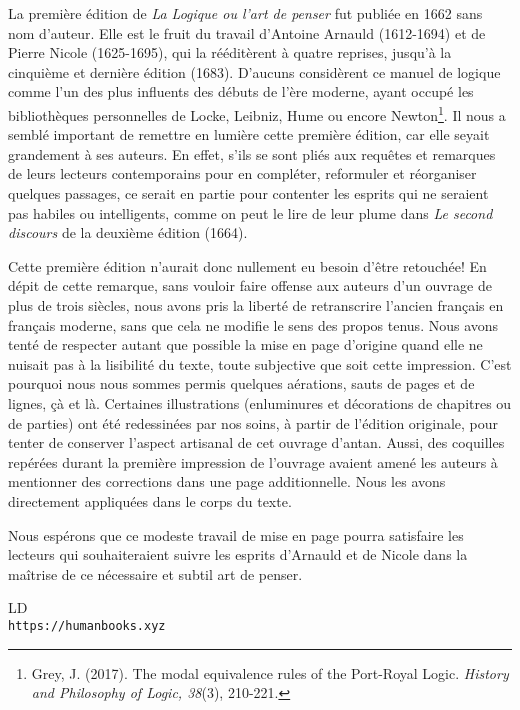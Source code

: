 La première édition de \emph {La Logique ou l'art de penser} fut publiée en 1662 sans nom d'auteur. Elle est le fruit du travail d'Antoine Arnauld (1612-1694) et de Pierre Nicole (1625-1695), qui la rééditèrent à quatre reprises, jusqu'à la cinquième et dernière édition (1683).
D'aucuns considèrent ce manuel de logique comme l'un des plus influents des débuts de l'ère moderne, ayant occupé les bibliothèques personnelles de Locke, Leibniz, Hume ou encore Newton\footnote{Grey, J. (2017). The modal equivalence rules of the Port-Royal Logic. \emph{History and Philosophy of Logic, 38}(3), 210-221.}.
Il nous a semblé important de remettre en lumière cette première édition, car elle seyait grandement à ses auteurs. En effet, s'ils se sont pliés aux requêtes et remarques de leurs lecteurs contemporains pour en compléter, reformuler et réorganiser quelques passages, ce serait en partie pour contenter les esprits qui ne seraient pas habiles ou intelligents, comme on peut le lire de leur plume dans \emph{Le second discours} de la deuxième édition (1664).

Cette première édition n'aurait donc nullement eu besoin d'être retouchée! En dépit de cette remarque, sans vouloir faire offense aux auteurs d'un ouvrage de plus de trois siècles, nous avons pris la liberté de retranscrire l'ancien français en français moderne, sans que cela ne modifie le sens des propos tenus. Nous avons tenté de respecter autant que possible la mise en page d'origine quand elle ne nuisait pas à la lisibilité du texte, toute subjective que soit cette impression. C'est pourquoi nous nous sommes permis quelques aérations, sauts de pages et de lignes, çà et là. Certaines illustrations (enluminures et décorations de chapitres ou de parties) ont été redessinées par nos soins, à partir de l'édition originale, pour tenter de conserver l'aspect artisanal de cet ouvrage d'antan.
Aussi, des coquilles repérées durant la première impression de l'ouvrage avaient amené les auteurs à mentionner des corrections dans une page additionnelle. Nous les avons directement appliquées dans le corps du texte.

Nous espérons que ce modeste travail de mise en page pourra satisfaire les lecteurs qui souhaiteraient suivre les esprits \mbox{d'Arnauld} et de Nicole dans la maîtrise de ce nécessaire et subtil art de penser.

 \begin{flushright}
	 {\small LD}
 	\\{\small \texttt{https://humanbooks.xyz}}
 \end{flushright}
